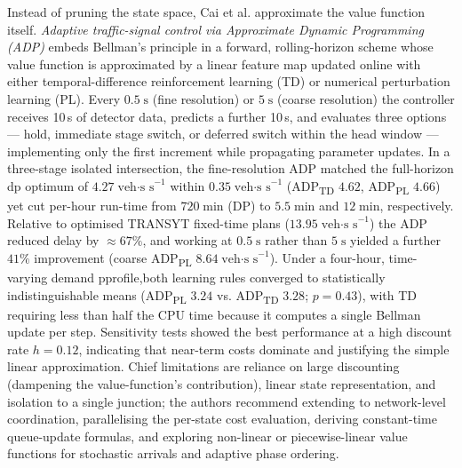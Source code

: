 \mynewline
Instead of pruning the state space, Cai et al. \cite{Cai2008} approximate the value function itself. \textit{Adaptive traffic-signal control via Approximate Dynamic Programming (ADP)} embeds Bellman’s principle in a forward, rolling-horizon scheme whose value function is approximated by a linear feature map updated online with either temporal-difference reinforcement learning (TD) or numerical perturbation learning (PL). Every $0.5\;\text{s}$ (fine resolution) or $5\;\text{s}$ (coarse resolution) the controller receives 10\,s of detector data, predicts a further 10\,s, and evaluates three options --- hold, immediate stage switch, or deferred switch within the head window --- implementing only the first increment while propagating parameter updates. In a three-stage isolated intersection, the fine-resolution ADP matched the full-horizon \ac{dp} optimum of $4.27\;\text{veh·s s}^{-1}$ within $0.35\;\text{veh·s s}^{-1}$ (ADP\textsubscript{TD} $4.62$, ADP\textsubscript{PL} $4.66$) yet cut per-hour run-time from $720\;$min (DP) to $5.5\;$min and $12\;$min, respectively. Relative to optimised TRANSYT fixed-time plans ($13.95\;\text{veh·s s}^{-1}$) the ADP reduced delay by $\approx67\%$, and working at $0.5\;\text{s}$ rather than $5\;\text{s}$ yielded a further $41\%$ improvement (coarse ADP\textsubscript{PL} $8.64\;\text{veh·s s}^{-1}$). Under a four-hour, time-varying demand pprofile,both learning rules converged to statistically indistinguishable means (ADP\textsubscript{PL} $3.24$ vs. ADP\textsubscript{TD} $3.28$; $p=0.43$), with TD requiring less than half the CPU time because it computes a single Bellman update per step. Sensitivity tests showed the best performance at a high discount rate $h=0.12$, indicating that near-term costs dominate and justifying the simple linear approximation. Chief limitations are reliance on large discounting (dampening the value-function’s contribution), linear state representation, and isolation to a single junction; the authors recommend extending to network-level coordination, parallelising the per-state cost evaluation, deriving constant-time queue-update formulas, and exploring non-linear or piecewise-linear value functions for stochastic arrivals and adaptive phase ordering.
\mynewline
